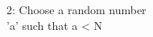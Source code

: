 \documentclass[preview]{standalone}
\begin{document}
\begin{center}
2: Choose a random number \\'a' such that a < N
\end{center}
\end{document}
